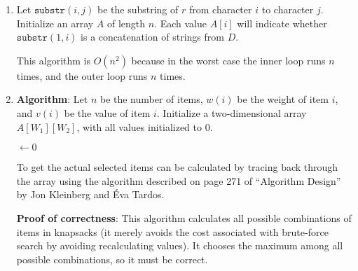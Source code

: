 \documentclass[a4paper, 10pt]{article}
\begin{document}
\begin{enumerate}
	\item Let $\texttt{substr}(i, j)$ be the substring of $r$ from character $i$
		to character $j$. Initialize an array $A$ of length $n$. Each value
		$A[i]$ will indicate whether $\texttt{substr}(1, i)$ is a concatenation
		of strings from $D$.

		\IncMargin{1em}
		\begin{algorithm}[h]
			\label{alg:prob2}
		\end{algorithm}

		This algorithm is $O(n^2)$ because in the worst case the inner loop runs
		$n$ times, and the outer loop runs $n$ times.

	\item \textbf{Algorithm}: Let $n$ be the number of items, $w(i)$ be the
		weight of item $i$, and $v(i)$ be the value of item $i$. Initialize a
		two-dimensional array $A[W_1][W_2]$, with all values initialized to 0.

		\begin{algorithm}[h]
			\maxValue $\gets 0$\;
			\Return{\maxValue}
			\label{alg:prob3}
		\end{algorithm}

		To get the actual selected items can be calculated by tracing back
		through the array using the algorithm described on page 271 of
		``Algorithm Design'' by Jon Kleinberg and Éva Tardos.

		\textbf{Proof of correctness}: This algorithm calculates all possible
		combinations of items in knapsacks (it merely avoids the cost associated
		with brute-force search by avoiding recalculating values). It chooses
		the maximum among all possible combinations, so it must be correct.


\end{enumerate}
\end{document}
